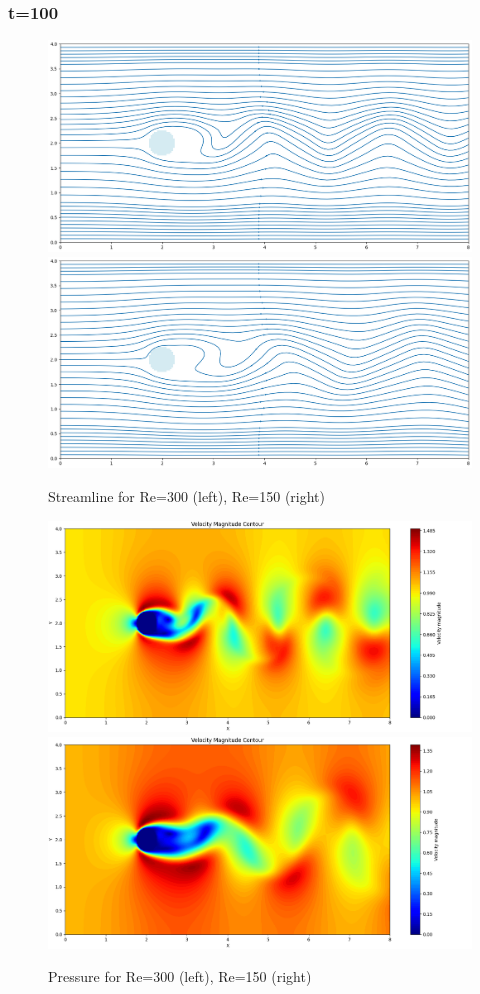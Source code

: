 \documentclass[12pt]{article}
\begin{document}
\subsubsection{t=100}
\begin{figure}[H]
    \centering
    \includegraphics[width=0.45\linewidth]{figure/N32_Re300_8x4_t100/stline_N32_Re300_8x4_t100.jpg}
    \includegraphics[width=0.45\linewidth]{figure/N32_Re150_8x4_t100/stline_N32_Re150_8x4_t100.jpg}
    \caption{Streamline for Re=300 (left), Re=150 (right) }
\end{figure}

\begin{figure}[H]
    \centering
    \includegraphics[width=0.45\linewidth]{figure/N32_Re300_8x4_t100/v_N32_Re300_8x4_t100.jpg}
    \includegraphics[width=0.45\linewidth]{figure/N32_Re150_8x4_t100/v_N32_Re150_8x4_t100.jpg}
    \caption{Pressure for Re=300 (left), Re=150 (right) }
\end{figure}
\end{document}
